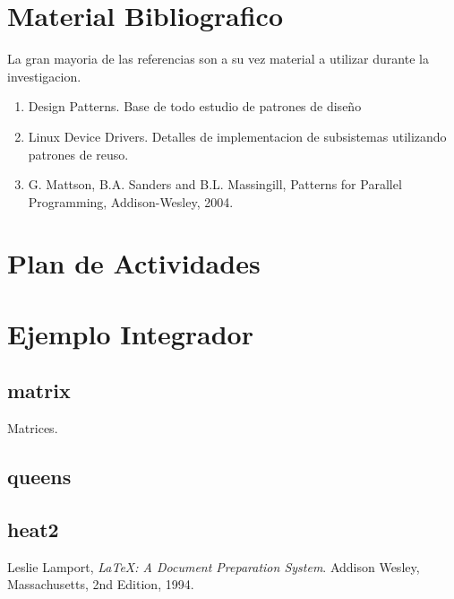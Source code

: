 \documentclass[a4paper,twocolumn]{article}
\begin{document}
\section{Material Bibliografico}

La gran mayoria de las referencias son a su vez material a utilizar durante la investigacion.

\begin{enumerate}
\item{Design Patterns}. Base de todo estudio de patrones de dise\~no
\item{Linux Device Drivers}. Detalles de implementacion de subsistemas utilizando patrones de reuso.
\item{G. Mattson, B.A. Sanders and B.L. Massingill, Patterns for Parallel Programming, Addison-Wesley, 2004}.
\end{enumerate}

\section{Plan de Actividades}

\appendix
\section{Ejemplo Integrador}

\subsection{matrix}

Matrices\cite{lamport94}.

\subsection{queens}

\subsection{heat2}

\begin{thebibliography}{9}
 
  Leslie Lamport,
  \emph{\LaTeX: A Document Preparation System}.
  Addison Wesley, Massachusetts,
  2nd Edition,
  1994.
 
\end{thebibliography}
\end{document}
